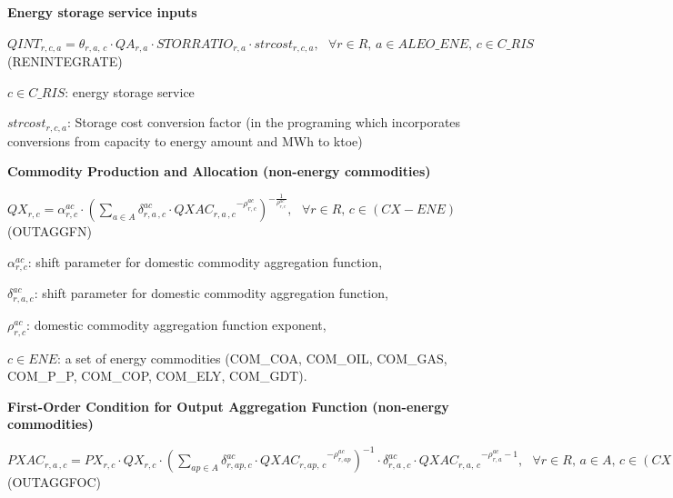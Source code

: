 \documentclass[10pt,a4paper,titlepage,dvipdfmx]{book}
\begin{document}
\begin{flushleft}\textbf{Energy storage service inputs }\end{flushleft}


\begin{center}$QINT_{r,c,a}=\theta _{r,a,\,c}\cdot QA_{r,a}\cdot STORRATIO_{r,a}\cdot strcost_{r,c,a},\,\,\,\,\forall r\in R,\,a\in ALEO\_ ENE,\,c\in C\_ RIS$ (RENINTEGRATE)
\end{center}

\begin{flushleft}
$c\in C\_ RIS$: energy storage service

$strcost_{r,c,a}$: Storage cost conversion factor (in the programing which incorporates conversions from capacity to energy amount and MWh to ktoe)
\end{flushleft}

\begin{flushleft}\textbf{Commodity Production and Allocation (non-energy commodities)}\end{flushleft}


\begin{center}$QX_{r,c}=\alpha _{r,c}^{ac}\cdot \left(\sum _{a\in A}\delta _{r,a\,,c}^{ac}\cdot QXA{C_{r,a\,,c}}^{-\rho _{r,c}^{ac}}\right)^{-\frac{1}{\rho _{r,c}^{ac}}},\,\,\,\,\forall r\in R,\,c\in \left(CX-ENE\right)$ (OUTAGGFN)
\end{center}

\begin{flushleft}
$\alpha _{r,c}^{ac}$: shift parameter for domestic commodity aggregation function,

$\delta _{r,a,c}^{ac}$: shift parameter for domestic commodity aggregation function,

$\rho _{r,c}^{ac}$: domestic commodity aggregation function exponent,

$c\in ENE$: a set of energy commodities (COM\_COA, COM\_OIL, COM\_GAS, COM\_P\_P, COM\_COP, COM\_ELY, COM\_GDT).
\end{flushleft}

\begin{flushleft}\textbf{First-Order Condition for Output Aggregation Function (non-energy commodities)}\end{flushleft}


\begin{center}$PXAC_{r,a\,,c}=PX_{r,c}\cdot QX_{r,c}\cdot \left(\sum _{ap\in A}\delta _{r,ap,c}^{ac}\cdot QXA{C_{r,ap,\,c}}^{-\rho _{r,ap}^{ac}}\right)^{-1}\cdot \delta _{r,a\,,c}^{ac}\cdot QXA{C_{r,a,\,c}}^{-\rho _{r,a}^{ac}-1},\,\,\,\,\forall r\in R,\,a\in A,\,c\in \left(CX-ENE\right)$ (OUTAGGFOC)
\end{center}
\end{document}
